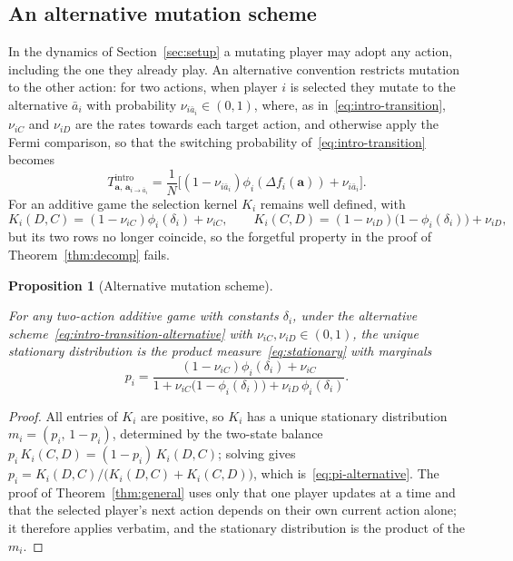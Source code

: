 \documentclass[11pt]{article}
\newtheorem{proposition}{Proposition}
\newcommand{\bfa}{\mathbf{a}}
\newcommand{\bfm}{\mathbf{m}} %
\newcommand{\intro}{\mathrm{intro}}
\providecommand{\DIFaddtex}[1]{{\protect\color{blue}\uwave{#1}}} %
\providecommand{\DIFdeltex}[1]{{\protect\color{red}\sout{#1}}}                      %
\providecommand{\DIFaddbegin}{} %
\providecommand{\DIFaddend}{} %
\providecommand{\DIFdelbegin}{} %
\providecommand{\DIFdelend}{} %
\providecommand{\DIFadd}[1]{\texorpdfstring{\DIFaddtex{#1}}{#1}} %
\providecommand{\DIFdel}[1]{\texorpdfstring{\DIFdeltex{#1}}{}} %
\newcommand{\DIFscaledelfig}{0.5}
\newlength{\DIFdelgraphicswidth} %
\newlength{\DIFdelgraphicsheight} %
\newcommand{\DIFaddincludegraphics}[2][]{{\color{blue}\fbox{\DIFOincludegraphics[#1]{#2}}}} %
\newcommand{\DIFdelincludegraphics}[2][]{%
\sbox{\DIFdelgraphicsbox}{\DIFOincludegraphics[#1]{#2}}%
\settoboxwidth{\DIFdelgraphicswidth}{\DIFdelgraphicsbox} %
\settoboxtotalheight{\DIFdelgraphicsheight}{\DIFdelgraphicsbox} %
\scalebox{\DIFscaledelfig}{%
\parbox[b]{\DIFdelgraphicswidth}{\usebox{\DIFdelgraphicsbox}\\[-\baselineskip] \rule{\DIFdelgraphicswidth}{0em}}\llap{\resizebox{\DIFdelgraphicswidth}{\DIFdelgraphicsheight}{%
\setlength{\unitlength}{\DIFdelgraphicswidth}%
\begin{picture}(1,1)%
\thicklines\linethickness{2pt} %
{\color[rgb]{1,0,0}\put(0,0){\framebox(1,1){}}}%
{\color[rgb]{1,0,0}\put(0,0){\line( 1,1){1}}}%
{\color[rgb]{1,0,0}\put(0,1){\line(1,-1){1}}}%
\end{picture}%
}\hspace*{3pt}}} %
} %
\DeclareRobustCommand{\DIFaddbegin}{\DIFOaddbegin \let\includegraphics\DIFaddincludegraphics} %
\DeclareRobustCommand{\DIFaddend}{\DIFOaddend \let\includegraphics\DIFOincludegraphics} %
\DeclareRobustCommand{\DIFdelbegin}{\DIFOdelbegin \let\includegraphics\DIFdelincludegraphics} %
\DeclareRobustCommand{\DIFdelend}{\DIFOaddend \let\includegraphics\DIFOincludegraphics} %
\begin{document}
\subsection{An alternative mutation scheme}\label{sec:alternative-mutation}

In the dynamics of Section~\ref{sec:setup} a mutating player may adopt any
action, including the one they already play. An alternative convention
restricts mutation to the other action: for two actions, when player \(i\)
is selected they mutate to the alternative \(\bar{a}_i\) with probability
\(\nu_{i\bar{a}_i}\in(0,1)\), where, as in~\eqref{eq:intro-transition},
\(\nu_{iC}\) and \(\nu_{iD}\) are the rates towards each target action, and
otherwise apply the Fermi comparison, so that the switching probability
of~\eqref{eq:intro-transition} becomes
\begin{equation}\label{eq:intro-transition-alternative}
  T^{\intro}_{\bfa,\,\bfa_{i\to\bar{a}_i}}
  = \frac{1}{N}\bigl[(1-\nu_{i\bar{a}_i})\phi_i(\Delta f_i(\bfa))
    +\nu_{i\bar{a}_i}\bigr].
\end{equation}
For an additive game the selection kernel \(K_i\) remains well defined,
with
\[
  K_i(D,C) = (1-\nu_{iC})\phi_i(\delta_i)+\nu_{iC}, \qquad
  K_i(C,D) = (1-\nu_{iD})\bigl(1-\phi_i(\delta_i)\bigr)+\nu_{iD},
\]
but its two rows no longer coincide, so the forgetful property in the proof
of Theorem~\ref{thm:decomp} fails.

\begin{proposition}[Alternative mutation scheme]\label{prop:alternative}

For any two-action additive game with constants \(\delta_i\), under the
alternative scheme~\eqref{eq:intro-transition-alternative} with
\(\nu_{iC},\nu_{iD}\in(0,1)\), the unique stationary distribution is the
product measure~\eqref{eq:stationary} with marginals
\begin{equation}\label{eq:pi-alternative}
  p_i = \frac{(1-\nu_{iC})\phi_i(\delta_i)+\nu_{iC}}{1+\nu_{iC}\bigl(1-\phi_i(\delta_i)\bigr)
               +\nu_{iD}\,\phi_i(\delta_i)}.
\end{equation}

\end{proposition}

\begin{proof}

All entries of \(K_i\) are positive, so \(K_i\) has a unique stationary
distribution \DIFdelbegin \DIFdel{\(m_i=(p_i,\,1-p_i)\)}\DIFdelend \DIFaddbegin \DIFadd{\(\bfm_i=(p_i,\,1-p_i)\)}\DIFaddend , determined by the two-state balance
\(p_i\,K_i(C,D)=(1-p_i)\,K_i(D,C)\); solving gives
\(p_i=K_i(D,C)/\bigl(K_i(D,C)+K_i(C,D)\bigr)\),
which is~\eqref{eq:pi-alternative}. The proof of Theorem~\ref{thm:general}
uses only that one player updates at a time and that the selected player's
next action depends on their own current action alone; it therefore applies
verbatim, and the stationary distribution is the product of the \DIFdelbegin \DIFdel{\(m_i\)}\DIFdelend \DIFaddbegin \DIFadd{\(\bfm_i\)}\DIFaddend .

\end{proof}
\end{document}
